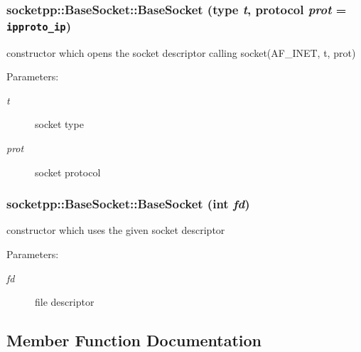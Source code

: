 \begin{CompactItemize}
{\subsubsection[{BaseSocket}]{\setlength{\rightskip}{0pt plus 5cm}socketpp::BaseSocket::BaseSocket (type {\em t}, \/  protocol {\em prot} = {\tt ipproto\_\-ip})}}
\label{classsocketpp_1_1BaseSocket_35c982d7aef2041c100439cf38aa7f4d}


constructor which opens the socket descriptor calling socket(AF\_\-INET, t, prot) 

\begin{Desc}
\item[Parameters:]
\begin{description}
\item[{\em t}]socket type \item[{\em prot}]socket protocol \end{description}
\end{Desc}
\hypertarget{classsocketpp_1_1BaseSocket_f7e18d6700868abb2b476e797506eafb}{
\subsubsection[{BaseSocket}]{\setlength{\rightskip}{0pt plus 5cm}socketpp::BaseSocket::BaseSocket (int {\em fd})}}
\label{classsocketpp_1_1BaseSocket_f7e18d6700868abb2b476e797506eafb}


constructor which uses the given socket descriptor 

\begin{Desc}
\item[Parameters:]
\begin{description}
\item[{\em fd}]file descriptor \end{description}
\end{Desc}


\subsection{Member Function Documentation}
\hypertarget{classsocketpp_1_1BaseSocket_aab800bcb5ee48cd4410ae2b9ed83e23}{
}
\end{CompactItemize}
